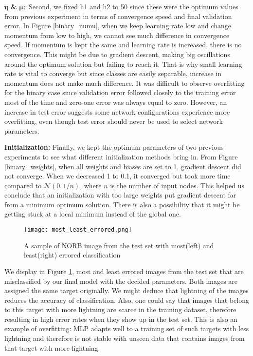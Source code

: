 \documentclass[10pt]{article}
\begin{document}
$\boldsymbol{\eta}$ \textbf{\&} $\boldsymbol{\mu:}$ Second, we fixed h1 and h2 to 50 since these were the optimum values from previous experiment in terms of convergence speed and final validation error. In Figure \ref{binary_numu}, when we keep learning rate low and change momentum from low to high, we cannot see much difference in convergence speed. If momentum is kept the same and learning rate is increased, there is no convergence. This might be due to gradient descent, making big oscillations around the optimum solution but failing to reach it. That is why small learning rate is vital to converge but since classes are easily separable, increase in momentum does not make much difference. It was difficult to observe overfitting for the binary case since validation error followed closely to the training error most of the time and zero-one error was always equal to zero. However, an increase in test error suggests some network configurations experience more overfitting, even though test error should never be used to select network parameters.

\textbf{Initialization:} Finally, we kept the optimum parameters of two previous experiments to see what different initialization methods bring in. From Figure \ref{binary_weights}, when all weights and biases are set to 1, gradient descent did not converge. When we decreased 1 to 0.1, it converged but took more time compared to $\mathcal{N}(0, 1/n)$, where $n$ is the number of input nodes. This helped us conclude that an initialization with too large weights put gradient descent far from a minimum optimum solution. There is also a possibility that it might be getting stuck at a local minimum instead of the global one.

\begin{figure}[H]
\texttt{[image: most\_least\_errored.png]}
\centering
\caption{A sample of NORB image from the test set with most(left) and least(right) errored classification}
\label{most_least_errored}
\end{figure}

We display in Figure \ref{most_least_errored}, most and least errored images from the test set that are misclassified by our final model with the decided parameters. Both images are assigned the same target originally. We might deduce that lightning of the images reduces the accuracy of classification. Also, one could say that images that belong to this target with more lightning are scarce in the training dataset, therefore resulting in high error rates when they show up in the test set. This is also an example of overfitting: MLP adapts well to a training set of such targets with less lightning and therefore is not stable with unseen data that contains images from that target with more lightning.
\end{document}
